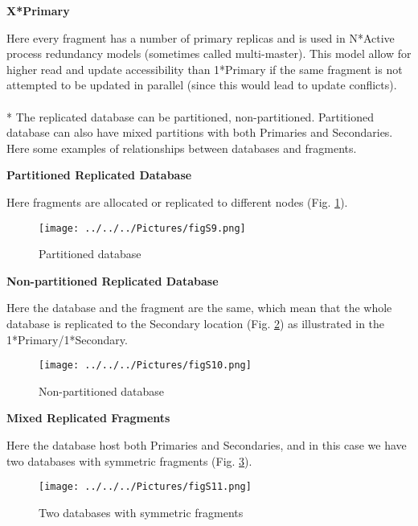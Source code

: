 \documentclass[english]{tktltiki2}
\theoremstyle{definition}
\theoremstyle{remark}
\begin{document}
\begin{flushleft}
\textbf{X*Primary}
\end{flushleft}
Here every fragment has a number of primary replicas and is used in N*Active process redundancy models (sometimes called multi-master). This model allow for higher read and update accessibility than 1*Primary if the same fragment is not attempted to be updated in parallel (since this would lead to update conflicts).\\ \\*
The replicated database can be partitioned, non-partitioned. Partitioned database can also have mixed partitions with both Primaries and Secondaries.
Here some examples of relationships between databases and fragments.
\begin{flushleft}
\textbf{Partitioned Replicated Database}
\end{flushleft}
Here fragments are allocated or replicated to different nodes (Fig. \ref{fig:N9}).

\begin{figure}[h!]
\texttt{[image: ../../../Pictures/figS9.png]} 
\caption{Partitioned database \cite{inproceedings}}
\label{fig:N9}
\end{figure}

\begin{flushleft}
\textbf{Non-partitioned Replicated Database}
\end{flushleft}
Here the database and the fragment are the same, which mean that the whole database is replicated to the Secondary location (Fig. \ref{fig:N10}) as illustrated in the 1*Primary/1*Secondary.
\begin{figure}[h!]
\texttt{[image: ../../../Pictures/figS10.png]} 
\caption{Non-partitioned database \cite{inproceedings}}
\label{fig:N10}
\end{figure}

\begin{flushleft}
\textbf{Mixed Replicated Fragments}
\end{flushleft}
Here the database host both Primaries and Secondaries, and in this case we have two databases with symmetric fragments (Fig. \ref{fig:N11}).
\begin{figure}[h!]
\texttt{[image: ../../../Pictures/figS11.png]} 
\caption{Two databases with symmetric fragments \cite{inproceedings}}
\label{fig:N11}
\end{figure}

 \pagebreak
\end{document}
